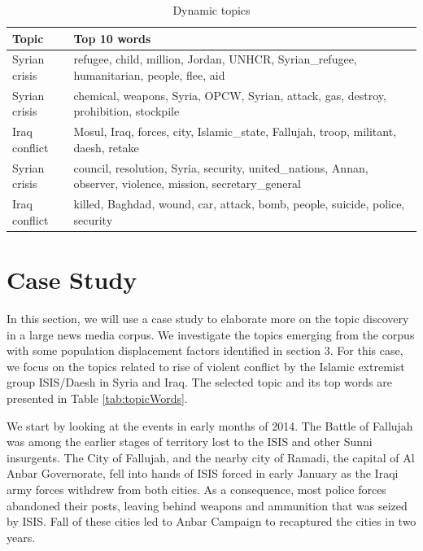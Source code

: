 \begin{table}[H]
{ \singlespacing
\small
\centering

\begin{tabularx}{\textwidth}{|l|X|}

 \hline
 Topic & Top 10 words   \\
 \hline\hline
 Syrian crisis &  refugee, child, million, Jordan, UNHCR, Syrian\_refugee, humanitarian, people, flee, aid\\
 \hline
 Syrian crisis &  chemical, weapons, Syria, OPCW, Syrian, attack, gas, destroy, prohibition, stockpile \\
 \hline
 Iraq conflict &  Mosul, Iraq, forces, city, Islamic\_state, Fallujah, troop, militant, daesh, retake \\
 \hline
 Syrian crisis &  council, resolution, Syria, security, united\_nations, Annan, observer, violence, mission, secretary\_general \\
 \hline
 Iraq conflict & killed, Baghdad, wound, car, attack, bomb, people, suicide, police, security
 \\ [1ex] 
 \hline
 
\end{tabularx}
\caption{Dynamic topics} \label{table:dynamictopicWords}
}
\end{table} 

\section{Case Study}
In this section, we will use a case study to elaborate more on the topic discovery in a large news media corpus. We investigate the topics emerging from the corpus with some population displacement factors identified in section 3. For this case, we focus on the topics related to rise of violent conflict by the Islamic extremist group ISIS/Daesh in Syria and Iraq. The selected topic and its top words are presented in Table \ref{tab:topicWords}. 

We start by looking at the events in early months of 2014. The Battle of Fallujah was among the earlier stages of territory lost to the ISIS and other Sunni insurgents. The City of Fallujah,  and the nearby city of Ramadi, the capital of Al Anbar Governorate, fell into hands of ISIS forced in early January as the Iraqi army forces withdrew from both cities.  As a consequence, most police forces abandoned their posts, leaving behind weapons and ammunition that was seized by ISIS. Fall of these cities led to Anbar Campaign to recaptured the cities in two years. 

